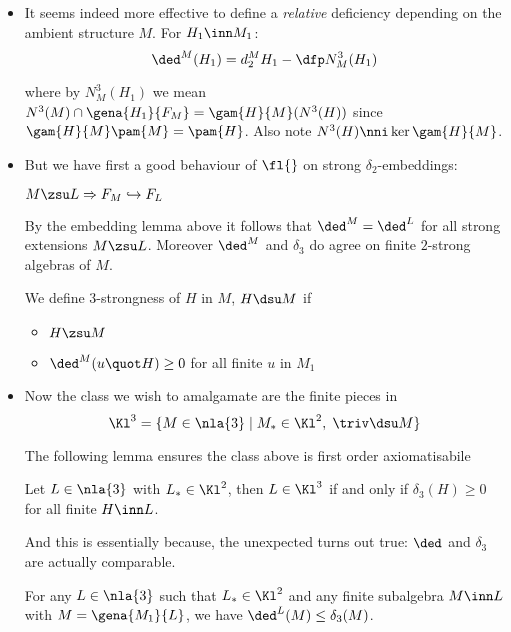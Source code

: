 \documentclass[a4paper,11pt,german,english]{report}
\begin{document}
\begin{itemize}
\item[]It seems indeed more effective to define a {\em relative} deficiency depending
on the ambient structure $M$. For $H_{1}\inn M_{1}$:
$$\ded^{M}(H_{1})=d^{M}_{2}H_{1}-\dfp N^{3}_{M}(H_{1})$$

where by $N^{3}_{M}(H_{1})$ we mean $N^{3}(M)\cap\gena{H_{1}}{F_{M}}=\gam{H}{M}
(N^{3}(H))$ since $\gam{H}{M}\pam{M}=\pam{H}$.
Also note $N^{3}(H)\nni\ker\gam{H}{M}$.

\item[]But we have first a good behaviour of $\fl{}$ on strong $\delta_{2}$-embeddings:

\begin{lem*}$M\zsu L\Rightarrow F_{M}\hookrightarrow F_{L}$
\end{lem*}


By the embedding lemma above
it follows that $\ded^{M}=\ded^{L}$ for all strong extensions $M\zsu L$.
Moreover $\ded^{M}$ and $\delta_{3}$ do agree on finite $2$-strong algebras of $M$.

We define $3$-strongness of $H$ in $M$, $H\dsu M$ if
\begin{itemize}
\item $H\zsu M$
\item $\ded^{M}(u\quot H)\geq0$ for all finite $u$ in $M_{1}$
\end{itemize}
\item[]Now the class we wish to amalgamate are the finite pieces in
$$\Kl^{3}=\{M\in\nla{3}\mid M_{*}\in\Kl^{2},\;\triv\dsu M\}$$

The following lemma ensures the class above
is first order axiomatisabile
\begin{lem*}
Let $L\in\nla{3}$ with $L_{*}\in\Kl^{2}$, then  $L\in\Kl^{3}$ if and only
if $\delta_{3}(H)\geq0$ for all finite $H\inn L$.
\end{lem*}

And this is essentially because, the unexpected turns out true: $\ded$ and $\delta_{3}$
are actually comparable.
\begin{lem*}
For any $L\in\nla{3}$ such that $L_{*}\in\Kl^{2}$ and any finite subalgebra $M\inn L$ with $M=\gena{M_{1}}{L}$, we have
$\ded^{L}(M)\leq\delta_{3}(M)$.
\end{lem*}


\end{itemize}
\end{document}
